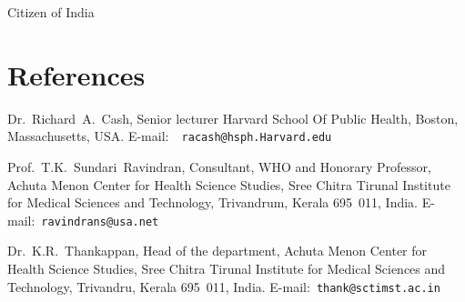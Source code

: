 \documentclass[margin,line]{res}
\begin{document}
\begin{resume}
Citizen of India

\section{\sc References}
Dr.~Richard~A.~Cash, Senior lecturer Harvard School Of
Public Health, Boston, Massachusetts, USA. E-mail:~{\tt
racash@hsph.Harvard.edu}

\vspace{-0.5em}

Prof.~T.K.~Sundari~Ravindran, Consultant, WHO and Honorary
Professor, Achuta Menon Center for Health Science Studies,
Sree Chitra Tirunal Institute for Medical Sciences and
Technology, Trivandrum, Kerala 695~011, India.
E-mail:~{\tt ravindrans@usa.net}

\vspace{-0.5em}

Dr.~K.R.~Thankappan, Head of the department, Achuta Menon
Center for Health Science Studies, Sree Chitra Tirunal
Institute for Medical Sciences and Technology, Trivandru,
Kerala 695~011, India.  E-mail:~{\tt thank@sctimst.ac.in}
\end{resume}
\end{document}
